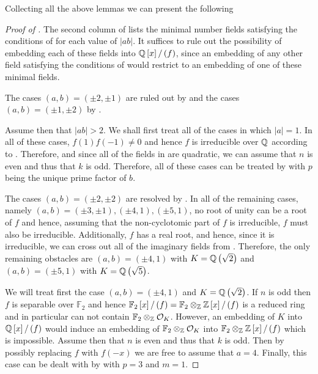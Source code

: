 \documentclass[../main.tex]{subfiles}
\begin{document}
Collecting all the above lemmas we can present the following
\begin{proof}[Proof of ]
  The second column of  lists the minimal number fields satisfying the conditions of  for each value of $\left| ab \right|$.
  It suffices to rule out the possibility of embedding each of these fields into $\mathbb{Q}\left[ x \right]/ \left( f \right)$, since an embedding of any other field satisfying the conditions of  would restrict to an embedding of one of these minimal fields.
  
  The cases $\left( a,b \right) = \left( \pm 2, \pm 1 \right)$ are ruled out by  and the cases $\left( a,b \right) = \left( \pm 1, \pm 2 \right)$ by .
  
  Assume then that $\left| ab \right| > 2$.
  We shall first treat all of the cases in which $\left| a \right| = 1$.
  In all of these cases, $f\left( 1 \right)f\left( -1 \right) \neq 0$ and hence $f$ is irreducible over $\mathbb{Q}$ according to .
  Therefore, and since all of the fields in  are quadratic, we can assume that $n$ is even and thus that $k$ is odd.
  Therefore, all of these cases can be treated by  with $p$ being the unique prime factor of $b$.

  The cases $\left( a,b \right) = \left( \pm 2, \pm 2 \right)$ are resolved by .
  In all of the remaining cases, namely $\left( a,b \right) = \left( \pm 3, \pm 1 \right), \left( \pm 4, 1 \right), \left( \pm 5, 1 \right)$, no root of unity can be a root of $f$ and hence, assuming that the non-cyclotomic part of $f$ is irreducible, $f$ must also be irreducible.
  Additionally, $f$ has a real root, and hence, since it is irreducible, we can cross out all of the imaginary fields from .
  Therefore, the only remaining obstacles are $\left( a,b \right) = \left( \pm 4, 1 \right)$ with $K = \mathbb{Q}\left( \sqrt{2} \right)$ and $\left( a,b \right) = \left( \pm 5, 1 \right)$ with $K = \mathbb{Q}\left( \sqrt{5} \right)$.
  
  We will treat first the case $\left( a,b \right) = \left( \pm 4, 1 \right)$ and $K = \mathbb{Q}\left( \sqrt{2} \right)$.
  If $n$ is odd then $f$ is separable over $\mathbb{F}_2$ and hence $\mathbb{F}_2\left[ x \right]/ \left( f \right) = \mathbb{F}_2 \otimes_{\mathbb{Z}} \mathbb{Z}\left[ x \right] / \left( f \right)$ is a reduced ring and in particular can not contain $\mathbb{F}_2 \otimes_{\mathbb{Z}} \mathcal{O}_K$.
  However, an embedding of $K$ into $\mathbb{Q}\left[ x \right]/ \left( f \right)$ would induce an embedding of $\mathbb{F}_2 \otimes_{\mathbb{Z}} \mathcal{O}_K$ into $\mathbb{F}_2 \otimes_{\mathbb{Z}} \mathbb{Z}\left[ x \right] / \left( f \right)$ which is impossible.
  Assume then that $n$ is even and thus that $k$ is odd.
  Then by possibly replacing $f$ with $f\left( -x \right)$ we are free to assume that $a = 4$.
  Finally, this case can be dealt with by  with $p = 3$ and $m = 1$.


\end{proof}
\end{document}
